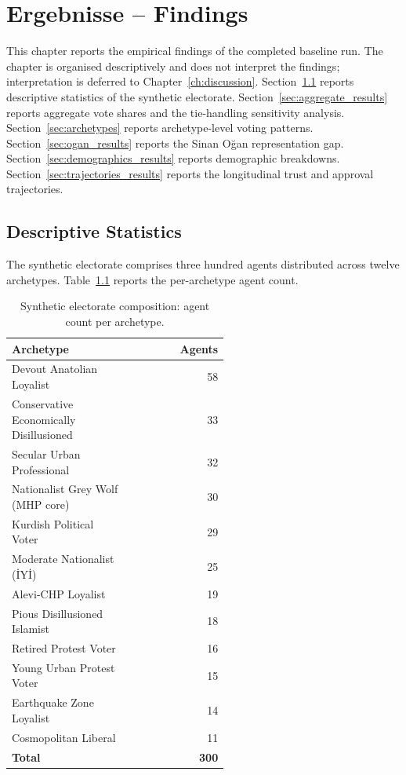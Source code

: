 \documentclass[12pt,a4paper]{report}
\begin{document}
\chapter{Ergebnisse -- Findings}
\label{ch:findings}

This chapter reports the empirical findings of the completed baseline run. The chapter is organised descriptively and does not interpret the findings; interpretation is deferred to Chapter~\ref{ch:discussion}. Section~\ref{sec:descriptive} reports descriptive statistics of the synthetic electorate. Section~\ref{sec:aggregate_results} reports aggregate vote shares and the tie-handling sensitivity analysis. Section~\ref{sec:archetypes} reports archetype-level voting patterns. Section~\ref{sec:ogan_results} reports the Sinan Oğan representation gap. Section~\ref{sec:demographics_results} reports demographic breakdowns. Section~\ref{sec:trajectories_results} reports the longitudinal trust and approval trajectories.

\section{Descriptive Statistics}
\label{sec:descriptive}

The synthetic electorate comprises three hundred agents distributed across twelve archetypes. Table~\ref{tab:archetype_counts} reports the per-archetype agent count.

\begin{table}[!ht]
\caption{Synthetic electorate composition: agent count per archetype.}
\label{tab:archetype_counts}
\centering
\begin{tabular}{@{}p{0.55\linewidth}r@{}}
\toprule
Archetype & Agents \\
\midrule
Devout Anatolian Loyalist & 58 \\
Conservative Economically Disillusioned & 33 \\
Secular Urban Professional & 32 \\
Nationalist Grey Wolf (MHP core) & 30 \\
Kurdish Political Voter & 29 \\
Moderate Nationalist (İYİ) & 25 \\
Alevi-CHP Loyalist & 19 \\
Pious Disillusioned Islamist & 18 \\
Retired Protest Voter & 16 \\
Young Urban Protest Voter & 15 \\
Earthquake Zone Loyalist & 14 \\
Cosmopolitan Liberal & 11 \\
\midrule
\textbf{Total} & \textbf{300} \\
\bottomrule
\end{tabular}
\end{table}
\end{document}
